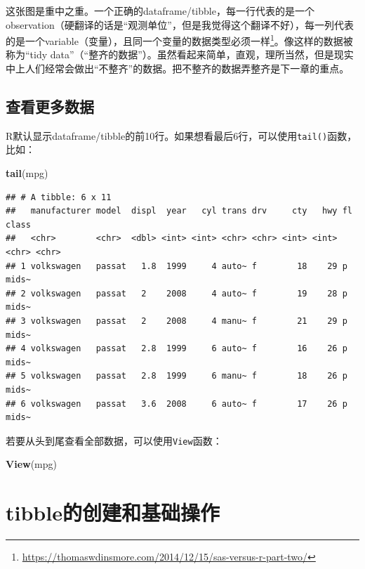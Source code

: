 \documentclass[]{book}
\newenvironment{Shaded}{\begin{snugshade}}{\end{snugshade}}
\newcommand{\KeywordTok}[1]{\textcolor[rgb]{0.13,0.29,0.53}{\textbf{#1}}}
\newcommand{\NormalTok}[1]{#1}
\let\rmarkdownfootnote\footnote%
\def\footnote{\protect\rmarkdownfootnote}
\begin{document}
这张图是重中之重。一个正确的dataframe/tibble，每一行代表的是一个observation（硬翻译的话是``观测单位''，但是我觉得这个翻译不好），每一列代表的是一个variable（变量），且同一个变量的数据类型必须一样\footnote{\url{https://thomaswdinsmore.com/2014/12/15/sas-versus-r-part-two/}}。像这样的数据被称为``tidy data''（``整齐的数据''）。虽然看起来简单，直观，理所当然，但是现实中上人们经常会做出``不整齐''的数据。把不整齐的数据弄整齐是下一章的重点。

\subsection{查看更多数据}

R默认显示dataframe/tibble的前10行。如果想看最后6行，可以使用\texttt{tail()}函数，比如：

\begin{Shaded}
\begin{Highlighting}[]
\KeywordTok{tail}\NormalTok{(mpg)}
\end{Highlighting}
\end{Shaded}

\begin{verbatim}
## # A tibble: 6 x 11
##   manufacturer model  displ  year   cyl trans drv     cty   hwy fl    class
##   <chr>        <chr>  <dbl> <int> <int> <chr> <chr> <int> <int> <chr> <chr>
## 1 volkswagen   passat   1.8  1999     4 auto~ f        18    29 p     mids~
## 2 volkswagen   passat   2    2008     4 auto~ f        19    28 p     mids~
## 3 volkswagen   passat   2    2008     4 manu~ f        21    29 p     mids~
## 4 volkswagen   passat   2.8  1999     6 auto~ f        16    26 p     mids~
## 5 volkswagen   passat   2.8  1999     6 manu~ f        18    26 p     mids~
## 6 volkswagen   passat   3.6  2008     6 auto~ f        17    26 p     mids~
\end{verbatim}

若要从头到尾查看全部数据，可以使用\texttt{View}函数：

\begin{Shaded}
\begin{Highlighting}[]
\KeywordTok{View}\NormalTok{(mpg)}
\end{Highlighting}
\end{Shaded}

\hypertarget{tibble}{%
\section{tibble的创建和基础操作}\label{tibble}}
\end{document}

